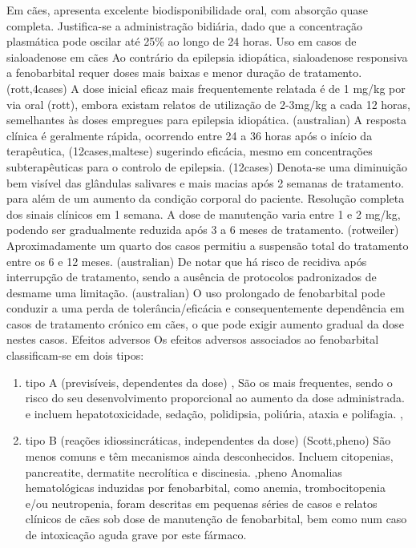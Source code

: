Em cães, apresenta excelente biodisponibilidade oral, com absorção quase completa. \cite{Jukier2023} Justifica-se a administração bidiária, dado que a concentração plasmática pode oscilar até 25\% ao longo de 24 horas. \cite{Jukier2023}
Uso em casos de sialoadenose em cães
Ao contrário da epilepsia idiopática, sialoadenose responsiva a fenobarbital requer doses mais baixas e menor duração de tratamento. (rott,4cases) A dose inicial eficaz mais frequentemente relatada é de 1 mg/kg por via oral (rott), embora existam relatos de utilização de 2-3mg/kg a cada 12 horas, semelhantes às doses empregues para epilepsia idiopática.  (australian) 
A resposta clínica é geralmente rápida, ocorrendo entre 24 a 36 horas após o início da terapêutica, (12cases,maltese) sugerindo eficácia, mesmo em concentrações subterapêuticas para o controlo de epilepsia. (12cases) Denota-se uma diminuição bem visível das glândulas salivares e mais macias após 2 semanas de tratamento. para além de um aumento da condição corporal do paciente. Resolução completa dos sinais clínicos em 1 semana.
A dose de manutenção varia entre 1 e 2 mg/kg, podendo ser gradualmente reduzida após 3 a 6 meses de tratamento. (rotweiler) Aproximadamente um quarto dos casos permitiu a suspensão total do tratamento entre os 6 e 12 meses. (australian)
De notar que há risco de recidiva após interrupção de tratamento, sendo a ausência de protocolos padronizados de desmame uma limitação. (australian) O uso prolongado de fenobarbital pode conduzir a uma perda de tolerância/eficácia e consequentemente dependência em casos de tratamento crónico em cães, o que pode exigir aumento gradual da dose nestes casos. 
Efeitos adversos
Os efeitos adversos associados ao fenobarbital classificam-se em dois tipos: \cite{Bersan2014}\cite{Walton-Clark2022}

\begin{enumerate}
    \item	tipo A \cite{Bersan2014}\cite{Walton-Clark2022} (previsíveis, dependentes da dose) \cite{Scott2021},\cite{Bersan2014} São os mais frequentes, sendo o risco do seu desenvolvimento proporcional ao aumento da dose administrada. \cite{Scott2021} e incluem hepatotoxicidade, sedação, polidipsia, poliúria, ataxia e polifagia. \cite{Scott2021},\cite{Bersan2014}
    \item tipo B \cite{Bersan2014}\cite{Walton-Clark2022} (reações idiossincráticas, independentes da dose) (Scott,pheno) São menos comuns e têm mecanismos ainda desconhecidos.\cite{Scott2021} Incluem citopenias, pancreatite, dermatite necrolítica e discinesia. \cite{Scott2021},pheno Anomalias hematológicas induzidas por fenobarbital, como anemia, trombocitopenia e/ou neutropenia, foram descritas em pequenas séries de casos e relatos clínicos de cães sob dose de manutenção de fenobarbital, bem como num caso de intoxicação aguda grave por este fármaco.\cite{Bersan2014}

\end{enumerate}

